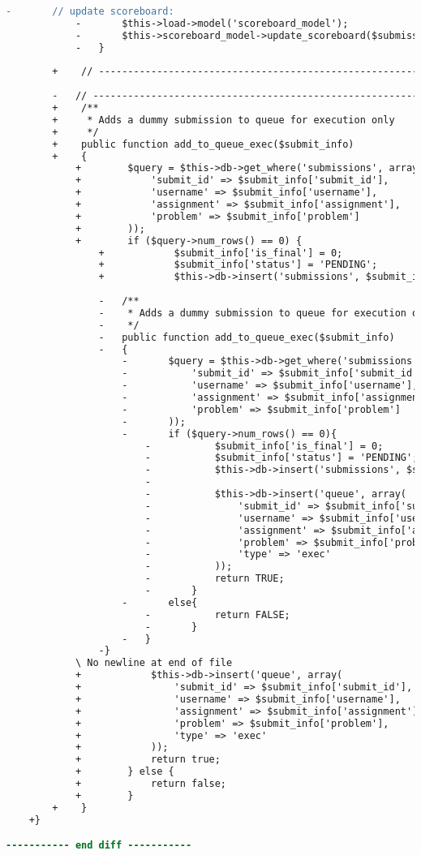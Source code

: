\begin{lstlisting}[language=diff, caption=Perubahan pada kode Queue\_model.php]
			-		// update scoreboard:
			-		$this->load->model('scoreboard_model');
			-		$this->scoreboard_model->update_scoreboard($submission['assignment']);
			-	}
		
		+    // ------------------------------------------------------------------------
		
		-	// ------------------------------------------------------------------------
		+    /**
		+     * Adds a dummy submission to queue for execution only
		+     */
		+    public function add_to_queue_exec($submit_info)
		+    {
			+        $query = $this->db->get_where('submissions', array(
			+            'submit_id' => $submit_info['submit_id'],
			+            'username' => $submit_info['username'],
			+            'assignment' => $submit_info['assignment'],
			+            'problem' => $submit_info['problem']
			+        ));
			+        if ($query->num_rows() == 0) {
				+            $submit_info['is_final'] = 0;
				+            $submit_info['status'] = 'PENDING';
				+            $this->db->insert('submissions', $submit_info);
				
				-	/**
				-	 * Adds a dummy submission to queue for execution only
				-	 */
				-	public function add_to_queue_exec($submit_info)
				-	{
					-		$query = $this->db->get_where('submissions', array(
					-			'submit_id' => $submit_info['submit_id'], 
					-			'username' => $submit_info['username'],
					-			'assignment' => $submit_info['assignment'],
					-			'problem' => $submit_info['problem']
					-		));
					-		if ($query->num_rows() == 0){
						-			$submit_info['is_final'] = 0;
						-			$submit_info['status'] = 'PENDING';
						-			$this->db->insert('submissions', $submit_info);
						-
						-			$this->db->insert('queue', array(
						-				'submit_id' => $submit_info['submit_id'],
						-				'username' => $submit_info['username'],
						-				'assignment' => $submit_info['assignment'],
						-				'problem' => $submit_info['problem'],
						-				'type' => 'exec'
						-			));
						-			return TRUE;
						-		}
					-		else{
						-			return FALSE;
						-		}
					-	}
				-}
			\ No newline at end of file
			+            $this->db->insert('queue', array(
			+                'submit_id' => $submit_info['submit_id'],
			+                'username' => $submit_info['username'],
			+                'assignment' => $submit_info['assignment'],
			+                'problem' => $submit_info['problem'],
			+                'type' => 'exec'
			+            ));
			+            return true;
			+        } else {
			+            return false;
			+        }
		+    }
	+}

----------- end diff -----------
\end{lstlisting}

